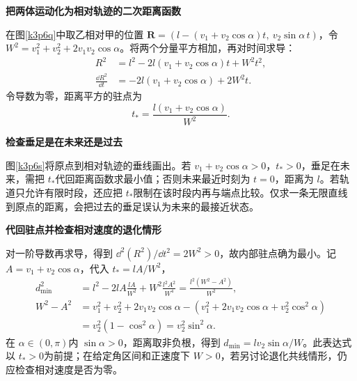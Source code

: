 \begin{solution}\textbf{把两体运动化为相对轨迹的二次距离函数}\par\nobreak
在图\ref{k3p6q}中取乙相对甲的位置 $\bm R=(l-(v_1+v_2\cos\alpha)t,\ v_2\sin\alpha\,t)$，令 $W^2=v_1^2+v_2^2+2v_1v_2\cos\alpha$。将两个分量平方相加，再对时间求导：
\begin{align*}
 R^2&=l^2-2l(v_1+v_2\cos\alpha)t+W^2t^2,\\
 \frac{\dd R^2}{\dd t}&=-2l(v_1+v_2\cos\alpha)+2W^2t.
\end{align*}
令导数为零，距离平方的驻点为
\[t_*=\frac{l(v_1+v_2\cos\alpha)}{W^2}.\]



\par\medskip{}\noindent\textbf{检查垂足是在未来还是过去}\par\nobreak
图\ref{k3p6s}将原点到相对轨迹的垂线画出。若 $v_1+v_2\cos\alpha>0$，$t_*>0$，垂足在未来，需把 $t_*$代回距离函数求最小值；否则未来最近时刻为 $t=0$，距离为 $l$。若轨道只允许有限时段，还应把 $t_*$限制在该时段内再与端点比较。仅求一条无限直线到原点的距离，会把过去的垂足误认为未来的最接近状态。



\par\medskip{}\noindent\textbf{代回驻点并检查相对速度的退化情形}\par\nobreak
对一阶导数再求导，得到 $\dd^2(R^2)/\dd t^2=2W^2>0$，故内部驻点确为最小。记 $A=v_1+v_2\cos\alpha$，代入 $t_*=lA/W^2$，
\begin{align*}
 d_{\min}^2&=l^2-2lA\frac{lA}{W^2}
 +W^2\frac{l^2A^2}{W^4}=\frac{l^2(W^2-A^2)}{W^2},\\
 W^2-A^2&=v_1^2+v_2^2+2v_1v_2\cos\alpha
 -(v_1^2+2v_1v_2\cos\alpha+v_2^2\cos^2\alpha)\\
 &=v_2^2(1-\cos^2\alpha)=v_2^2\sin^2\alpha.
\end{align*}
在 $\alpha\in(0,\pi)$内 $\sin\alpha>0$，距离取非负根，得到 $\boxed{d_{\min}=lv_2\sin\alpha/W}$。此表达式以 $t_*>0$为前提；在给定角区间和正速度下 $W>0$，若另讨论退化共线情形，仍应检查相对速度是否为零。\end{solution}

